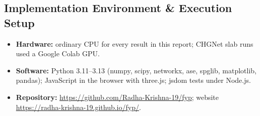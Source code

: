 \documentclass[11pt, a4paper]{article}
\begin{document}
\subsection{Implementation Environment \& Execution Setup}
\begin{itemize}[noitemsep, topsep=2pt]
    \item \textbf{Hardware:} ordinary CPU for every result in this report; CHGNet slab runs used a Google Colab GPU.
    \item \textbf{Software:} Python 3.11--3.13 (numpy, scipy, networkx, ase, spglib, matplotlib, pandas); JavaScript in the browser with three.js; jsdom tests under Node.js.
    \item \textbf{Repository:} \url{https://github.com/Radha-Krishna-19/fyp}; \newline website \url{https://radha-krishna-19.github.io/fyp/}.
\end{itemize}
\end{document}
